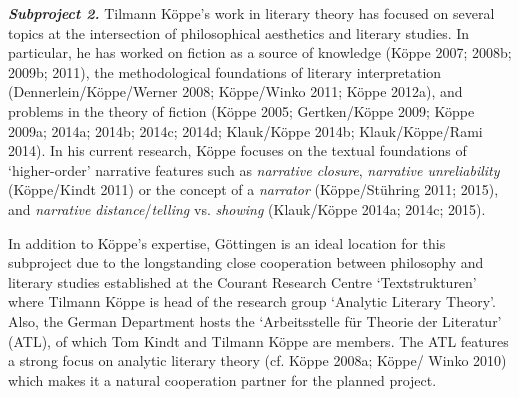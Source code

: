 \vspace{.2cm}
\noindent \textbf{\emph{Subproject 2.}} Tilmann K\"oppe's work in literary theory has focused on several topics at the intersection of philosophical aesthetics and literary studies. In particular, he has worked on fiction as a source of knowledge (K\"oppe 2007; 2008b; 2009b; 2011), the methodological foundations of literary interpretation (Dennerlein/K\"oppe/Werner 2008; K\"oppe/Winko 2011; K\"oppe 2012a), and problems in the theory of fiction (K\"oppe 2005; Gertken/K\"oppe 2009; K\"oppe 2009a; 2014a; 2014b; 2014c; 2014d; Klauk/K\"oppe 2014b; Klauk/K\"oppe/Rami 2014). In his current research, K\"oppe focuses on the textual foundations of `higher-order' narrative features such as \emph{narrative closure}, \emph{narrative unreliability} (K\"oppe/Kindt 2011) or the concept of a \emph{narrator} (K\"oppe/St\"uhring 2011; 2015), and \emph{narrative distance}/\emph{telling} vs. \emph{showing} (Klauk/K\"oppe 2014a; 2014c; 2015). 

In addition to K\"oppe's expertise, G\"ottingen is an ideal location for this subproject due to the longstanding close cooperation between philosophy and literary studies established at the Courant Research Centre `Textstrukturen' where Tilmann K\"oppe is head of the research group `Analytic Literary Theory'. Also, the German Department hosts the `Arbeitsstelle f\"ur Theorie der Literatur' (ATL), of which Tom Kindt and Tilmann K\"oppe are members. The ATL features a strong focus on analytic literary theory (cf. K\"oppe 2008a; K\"oppe/ Winko 2010) which makes it a natural cooperation partner for the planned project. %

